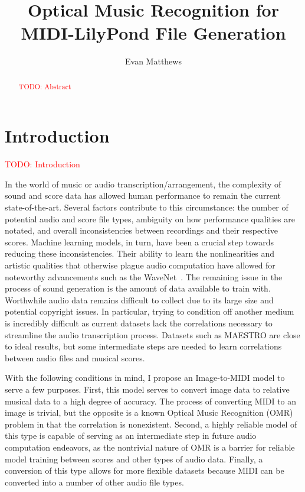 \documentclass[review,sigconf]{acmart}
\newcommand{\todo}[1]{\textcolor{red}{TODO: #1}}
\begin{document}
\title[omr-lilypond-midi]{Optical Music Recognition for MIDI-LilyPond File Generation}
\author{Evan Matthews}

\begin{abstract}
\todo{Abstract}
\end{abstract}

\maketitle

\section{Introduction}
\todo{Introduction}
~\cite{oord2016wavenet,contreras2023omrcnn,contreras2023omrpiano,mayer2024practical,andrea2021note}

In the world of music or audio transcription/arrangement, the complexity of sound and score data has allowed human performance to remain the current state-of-the-art. Several factors contribute to this circumstance: the number of potential audio and score file types, ambiguity on how performance qualities are notated, and overall inconsistencies between recordings and their respective scores. Machine learning models, in turn, have been a crucial step towards reducing these inconsistencies. Their ability to learn the nonlinearities and artistic qualities that otherwise plague audio computation have allowed for noteworthy advancements such as the WaveNet~\cite{oord2016wavenet}. The remaining issue in the process of sound generation is the amount of data available to train with. Worthwhile audio data remains difficult to collect due to its large size and potential copyright issues. In particular, trying to condition off another medium is incredibly difficult as current datasets lack the correlations necessary to streamline the audio transcription process. Datasets such as MAESTRO are close to ideal results, but some intermediate steps are needed to learn correlations between audio files and musical scores.

With the following conditions in mind, I propose an Image-to-MIDI model to serve a few purposes. First, this model serves to convert image data to relative musical data to a high degree of accuracy. The process of converting MIDI to an image is trivial, but the opposite is a known Optical Music Recognition (OMR) problem in that the correlation is nonexistent. 
Second, a highly reliable model of this type is capable of serving as an intermediate step in future audio computation endeavors, as the nontrivial nature of OMR is a barrier for reliable model training between scores and other types of audio data. 
Finally, a conversion of this type allows for more flexible datasets because MIDI can be converted into a number of other audio file types.
\end{document}
